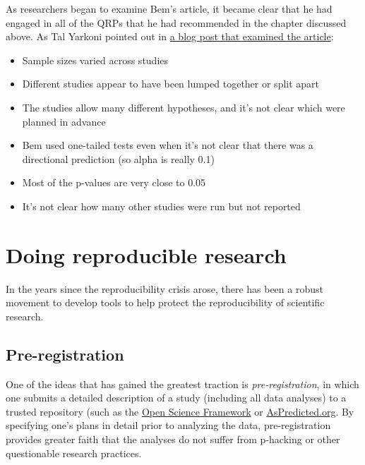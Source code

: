 \documentclass[]{book}
\providecommand{\tightlist}{%
  \setlength{\itemsep}{0pt}\setlength{\parskip}{0pt}}
\theoremstyle{definition}
\theoremstyle{definition}
\theoremstyle{definition}
\theoremstyle{remark}
\begin{document}
As researchers began to examine Bem's article, it became clear that he
had engaged in all of the QRPs that he had recommended in the chapter
discussed above. As Tal Yarkoni pointed out in
\href{http://www.talyarkoni.org/blog/2011/01/10/the-psychology-of-parapsychology-or-why-good-researchers-publishing-good-articles-in-good-journals-can-still-get-it-totally-wrong/}{a
blog post that examined the article}:

\begin{itemize}
\tightlist
\item
  Sample sizes varied across studies
\item
  Different studies appear to have been lumped together or split apart
\item
  The studies allow many different hypotheses, and it's not clear which
  were planned in advance
\item
  Bem used one-tailed tests even when it's not clear that there was a
  directional prediction (so alpha is really 0.1)
\item
  Most of the p-values are very close to 0.05
\item
  It's not clear how many other studies were run but not reported
\end{itemize}

\section{Doing reproducible
research}\label{doing-reproducible-research-1}

In the years since the reproducibility crisis arose, there has been a
robust movement to develop tools to help protect the reproducibility of
scientific research.

\subsection{Pre-registration}\label{pre-registration}

One of the ideas that has gained the greatest traction is
\emph{pre-registration}, in which one submits a detailed description of
a study (including all data analyses) to a trusted repository (such as
the \href{http://osf.io}{Open Science Framework} or
\href{http://aspredicted.org}{AsPredicted.org}. By specifying one's
plans in detail prior to analyzing the data, pre-registration provides
greater faith that the analyses do not suffer from p-hacking or other
questionable research practices.
\end{document}
